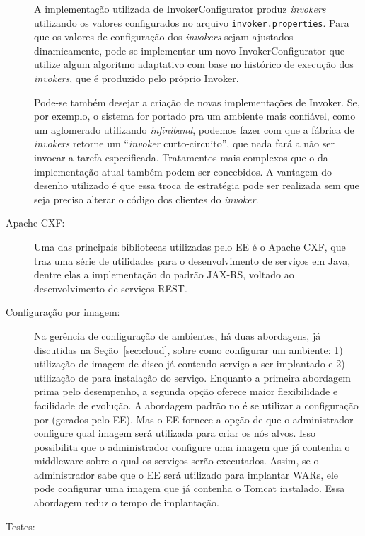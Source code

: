\begin{description}
A implementação utilizada de \textsf{InvokerConfigurator} produz \emph{invokers}
utilizando os valores configurados no arquivo \texttt{invoker.properties}.
Para que os valores de configuração dos \emph{invokers}
sejam ajustados dinamicamente,
pode-se implementar um novo \textsf{InvokerConfigurator}
que utilize algum algoritmo adaptativo com base no histórico
de execução dos \emph{invokers}, que é produzido pelo próprio \textsf{Invoker}.

Pode-se também desejar a criação de novas implementações de \textsf{Invoker}.
Se, por exemplo, o sistema for portado pra um ambiente mais confiável,
como um aglomerado utilizando \emph{infiniband},
podemos fazer com que a fábrica de \emph{invokers} retorne
um ``\emph{invoker} curto-circuito'', que nada fará
a não ser invocar a tarefa especificada.
Tratamentos mais complexos que o da implementação atual também podem
ser concebidos.
A vantagem do desenho utilizado é que essa troca de estratégia
pode ser realizada sem que seja preciso alterar
o código dos clientes do \emph{invoker}.

\item [Apache CXF:]

Uma das principais bibliotecas utilizadas pelo EE é o Apache CXF,
que traz uma série de utilidades para o desenvolvimento de serviços em Java,
dentre elas a implementação do padrão JAX-RS, voltado ao desenvolvimento de serviços REST.

\item [Configuração por imagem:]

Na gerência de configuração de ambientes, há duas abordagens, 
já discutidas na Seção~\ref{sec:cloud}, sobre como configurar um ambiente:
1) utilização de imagem de disco já contendo serviço a ser implantado
e 2) utilização de \scripts para instalação do serviço.
Enquanto a primeira abordagem prima pelo desempenho,
a segunda opção oferece maior flexibilidade e facilidade de evolução.
A abordagem padrão no \ee é se utilizar a configuração por \scripts (gerados pelo EE).
Mas o EE fornece a opção de que o administrador configure qual imagem será
utilizada para criar os nós alvos.
Isso possibilita que o administrador configure uma imagem 
que já contenha o middleware sobre o qual os serviços serão executados.
Assim, se o administrador sabe que o EE será utilizado para implantar WARs,
ele pode configurar uma imagem que já contenha o Tomcat instalado.
Essa abordagem reduz o tempo de implantação.

\item [Testes:] 


\end{description}
